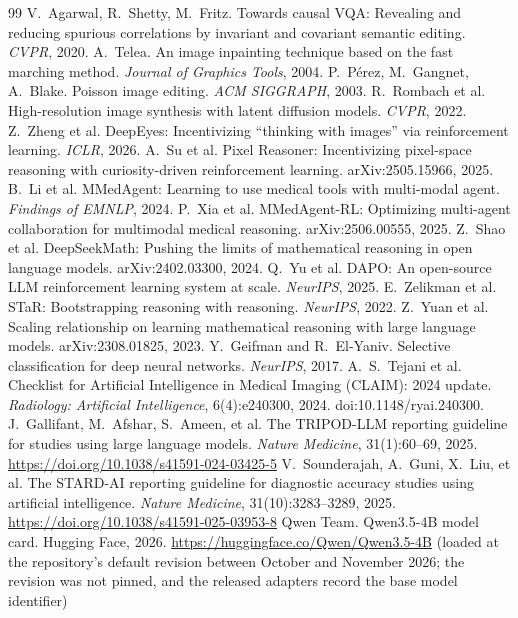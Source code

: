 \documentclass[11pt]{article}
\begin{document}
\begin{thebibliography}{99}
 V.~Agarwal, R.~Shetty, M.~Fritz. Towards causal VQA: Revealing and reducing spurious correlations by invariant and covariant semantic editing. \emph{CVPR}, 2020.
 A.~Telea. An image inpainting technique based on the fast marching method. \emph{Journal of Graphics Tools}, 2004.
 P.~P\'erez, M.~Gangnet, A.~Blake. Poisson image editing. \emph{ACM SIGGRAPH}, 2003.
 R.~Rombach et al. High-resolution image synthesis with latent diffusion models. \emph{CVPR}, 2022.
 Z.~Zheng et al. DeepEyes: Incentivizing ``thinking with images'' via reinforcement learning. \emph{ICLR}, 2026.
 A.~Su et al. Pixel Reasoner: Incentivizing pixel-space reasoning with curiosity-driven reinforcement learning. arXiv:2505.15966, 2025.
 B.~Li et al. MMedAgent: Learning to use medical tools with multi-modal agent. \emph{Findings of EMNLP}, 2024.
 P.~Xia et al. MMedAgent-RL: Optimizing multi-agent collaboration for multimodal medical reasoning. arXiv:2506.00555, 2025.
 Z.~Shao et al. DeepSeekMath: Pushing the limits of mathematical reasoning in open language models. arXiv:2402.03300, 2024.
 Q.~Yu et al. DAPO: An open-source LLM reinforcement learning system at scale. \emph{NeurIPS}, 2025.
 E.~Zelikman et al. STaR: Bootstrapping reasoning with reasoning. \emph{NeurIPS}, 2022.
 Z.~Yuan et al. Scaling relationship on learning mathematical reasoning with large language models. arXiv:2308.01825, 2023.
 Y.~Geifman and R.~El-Yaniv. Selective classification for deep neural networks. \emph{NeurIPS}, 2017.
 A.~S.~Tejani et al. Checklist for Artificial Intelligence in Medical Imaging (CLAIM): 2024 update. \emph{Radiology: Artificial Intelligence}, 6(4):e240300, 2024. doi:10.1148/ryai.240300.
 J.~Gallifant, M.~Afshar, S.~Ameen, et al. The TRIPOD-LLM reporting guideline for studies using large language models. \emph{Nature Medicine}, 31(1):60--69, 2025. \url{https://doi.org/10.1038/s41591-024-03425-5}
 V.~Sounderajah, A.~Guni, X.~Liu, et al. The STARD-AI reporting guideline for diagnostic accuracy studies using artificial intelligence. \emph{Nature Medicine}, 31(10):3283--3289, 2025. \url{https://doi.org/10.1038/s41591-025-03953-8}
 Qwen Team. Qwen3.5-4B model card. Hugging Face, 2026. \url{https://huggingface.co/Qwen/Qwen3.5-4B} (loaded at the repository's default revision between October and November 2026; the revision was not pinned, and the released adapters record the base model identifier)

\end{thebibliography}
\end{document}
